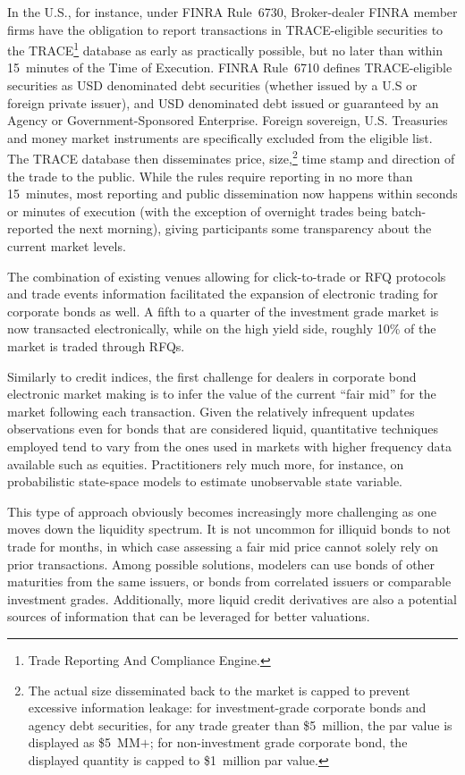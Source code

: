 In the U.S., for instance, under FINRA Rule~6730, Broker-dealer FINRA member firms have the obligation to report transactions in TRACE-eligible securities to the TRACE\footnote{Trade Reporting And Compliance Engine.} database as early as practically possible, but no later than within 15~minutes of the Time of Execution. FINRA Rule~6710 defines TRACE-eligible securities as USD denominated debt securities (whether issued by a U.S or foreign private issuer), and USD denominated debt issued or guaranteed by an Agency or Government-Sponsored Enterprise. Foreign sovereign, U.S. Treasuries and money market instruments are specifically excluded from the eligible list. The TRACE database then disseminates price, size,\footnote{The actual size disseminated back to the market is capped to prevent excessive information leakage: for investment-grade corporate bonds and agency debt securities, for any trade greater than \$5~million, the par value is displayed as \$5~MM$+$; for non-investment grade corporate bond, the displayed quantity is capped to \$1~million par value.} time stamp and direction of the trade to the public. While the rules require reporting in no more than 15~minutes, most reporting and public dissemination now happens within seconds or minutes of execution (with the exception of overnight trades being batch-reported the next morning), giving participants some transparency about the current market levels.


The combination of existing venues allowing for click-to-trade or RFQ protocols and trade events information facilitated the expansion of electronic trading for corporate bonds as well. A fifth to a quarter of the investment grade market is now transacted electronically, while on the high yield side, roughly 10\% of the market is traded through RFQs.


Similarly to credit indices, the first challenge for dealers in corporate bond electronic market making is to infer the value of the current ``fair mid'' for the market following each transaction. Given the relatively infrequent updates observations even for bonds that are considered liquid, quantitative techniques employed tend to vary from the ones used in markets with higher frequency data available such as equities. Practitioners rely much more, for instance, on probabilistic state-space models to estimate unobservable state variable.


This type of approach obviously becomes increasingly more challenging as one moves down the liquidity spectrum. It is not uncommon for illiquid bonds to not trade for months, in which case assessing a fair mid price cannot solely rely on prior transactions. Among possible solutions, modelers can use bonds of other maturities from the same issuers, or bonds from correlated issuers or comparable investment grades. Additionally, more liquid credit derivatives are also a potential sources of information that can be leveraged for better valuations. 



